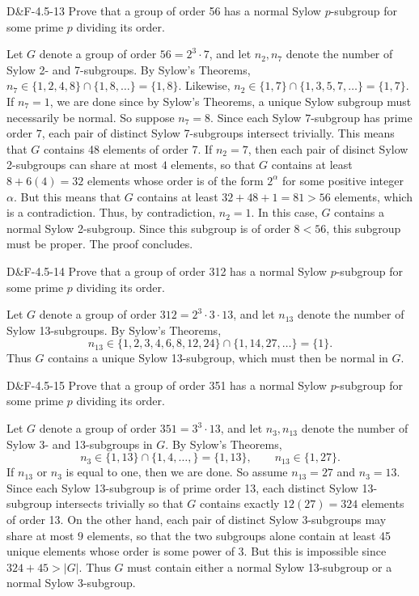 \documentclass{article}
\begin{document}
	\begin{prb}{D\&F-4.5-13}
		Prove that a group of order 56 has a normal Sylow $p$-subgroup for some prime $p$ dividing its order. 
	\end{prb}
	Let $G$ denote a group of order $56 = 2^{3} \cdot 7$, and let $n_{2}, n_{7}$ denote the number of Sylow 2- and 7-subgroups. By Sylow's Theorems, $n_{7} \in \{1, 2, 4, 8\} \cap \{1, 8, \ldots\} = \{1, 8\}$. Likewise, $n_{2} \in \{1, 7\} \cap \{1, 3, 5, 7, \ldots\} = \{1, 7\}$. If $n_{7} = 1$, we are done since by Sylow's Theorems, a unique Sylow subgroup must necessarily be normal. So suppose $n_{7} = 8$. Since each Sylow $7$-subgroup has prime order $7$, each pair of distinct Sylow 7-subgroups intersect trivially. This means that $G$ contains 48 elements of order 7. If $n_{2} = 7$, then each pair of disinct Sylow 2-subgroups can share at most $4$ elements, so that $G$ contains at least $8 + 6(4) = 32$ elements whose order is of the form $2^{\alpha}$ for some positive integer $\alpha$. But this means that $G$ contains at least $32 + 48 + 1 = 81 > 56$ elements, which is a contradiction. Thus, by contradiction, $n_{2} = 1$. In this case, $G$ contains a normal Sylow 2-subgroup. Since this subgroup is of order $8 < 56$, this subgroup must be proper. The proof concludes. 
	\begin{prb}{D\&F-4.5-14}
		Prove that a group of order 312 has a normal Sylow $p$-subgroup for some prime $p$ dividing its order. 
	\end{prb}
	Let $G$ denote a group of order $312 = 2^{3} \cdot 3 \cdot 13$, and let $n_{13}$ denote the number of Sylow 13-subgroups. By Sylow's Theorems, 
	\begin{equation*}
		n_{13} \in \{1, 2, 3, 4, 6, 8, 12, 24\} \cap \{1, 14, 27, \ldots\} = \{1\}. 
	\end{equation*}
	Thus $G$ contains a unique Sylow 13-subgroup, which must then be normal in $G$. 
	
	\begin{prb}{D\&F-4.5-15}
		Prove that a group of order 351 has a normal Sylow $p$-subgroup for some prime $p$ dividing its order. 
	\end{prb}
	Let $G$ denote a group of order $351 = 3^{3} \cdot 13$, and let $n_{3}, n_{13}$ denote the number of Sylow 3- and 13-subgroups in $G$. By Sylow's Theorems, 
	\begin{equation*}
		n_{3} \in \{1, 13\} \cap \{1, 4, \ldots, \} = \{1, 13\}, \qquad n_{13} \in \{1, 27\}. 
	\end{equation*}
	If $n_{13}$ or $n_{3}$ is equal to one, then we are done. So assume $n_{13} = 27$ and $n_{3} = 13$. Since each Sylow 13-subgroup is of prime order 13, each distinct Sylow 13-subgroup intersects trivially so that $G$ contains exactly $12(27) = 324$ elements of order 13. On the other hand, each pair of distinct Sylow 3-subgroups may share at most $9$ elements, so that the two subgroups alone contain at least 45 unique elements whose order is some power of 3. But this is impossible since $324 + 45 > |G|$. Thus $G$ must contain either a normal Sylow 13-subgroup or a normal Sylow 3-subgroup. 
	
\end{document}
